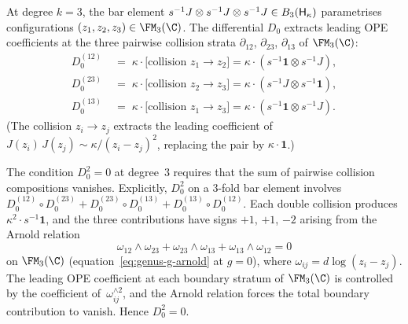 \begin{verification}
\label{ver:heis-arnold-3}
At degree $k = 3$, the bar element
$s^{-1}J \otimes s^{-1}J \otimes s^{-1}J \in B_3(\mathsf{H}_\kappa)$
parametrises configurations $(z_1, z_2, z_3) \in \FM_3(\C)$.
The differential $D_0$ extracts leading OPE coefficients at the three
pairwise collision strata $\partial_{12}$, $\partial_{23}$,
$\partial_{13}$ of $\FM_3(\C)$:
\begin{align*}
 D_0^{(12)} &\;=\; \kappa \cdot
 \bigl[\text{collision } z_1 \to z_2\bigr]
 = \kappa \cdot (s^{-1}\mathbf{1} \otimes s^{-1}J), \\
 D_0^{(23)} &\;=\; \kappa \cdot
 \bigl[\text{collision } z_2 \to z_3\bigr]
 = \kappa \cdot (s^{-1}J \otimes s^{-1}\mathbf{1}), \\
 D_0^{(13)} &\;=\; \kappa \cdot
 \bigl[\text{collision } z_1 \to z_3\bigr]
 = \kappa \cdot (s^{-1}\mathbf{1} \otimes s^{-1}J).
\end{align*}
(The collision $z_i \to z_j$ extracts the leading coefficient
of $J(z_i)\, J(z_j) \sim \kappa/(z_i - z_j)^2$,
replacing the pair by $\kappa \cdot \mathbf{1}$.)

The condition $D_0^2 = 0$ at degree~$3$ requires that the
sum of pairwise collision compositions vanishes. Explicitly,
$D_0^2$ on a $3$-fold bar element involves
$D_0^{(12)} \circ D_0^{(23)} + D_0^{(23)} \circ D_0^{(13)}
+ D_0^{(13)} \circ D_0^{(12)}$. Each double collision produces
$\kappa^2 \cdot s^{-1}\mathbf{1}$, and the three contributions
have signs $+1$, $+1$, $-2$ arising from the Arnold relation
\[
 \omega_{12} \wedge \omega_{23}
 + \omega_{23} \wedge \omega_{13}
 + \omega_{13} \wedge \omega_{12} = 0
\]
on $\FM_3(\C)$
(equation~\eqref{eq:genus-g-arnold} at $g = 0$), where
$\omega_{ij} = d\log(z_i - z_j)$.
The leading OPE coefficient at each boundary stratum of $\FM_3(\C)$
is controlled by the coefficient of~$\omega_{ij}^{\wedge 2}$, and the
Arnold relation forces the total boundary contribution to
vanish. Hence $D_0^2 = 0$.
\end{verification}

